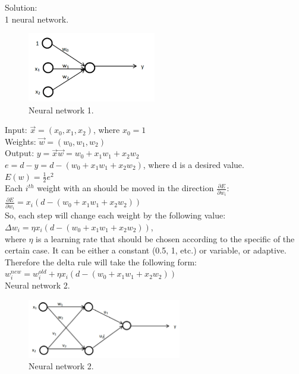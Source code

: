 \documentclass[a4paper, 12pt]{article}
\begin{document}
Solution:\\

1 neural network.\\

\begin{figure}[h]
  \centering
  \caption{Neural network 1. \label{fig:nn1}}
  \includegraphics[width=0.5\textwidth]{nn1}
\end{figure}

Input: 	$\vec{x} = (x_0, x_1, x_2)$,  where $x_0 = 1$\\
Weights: 	$\vec{w} = (w_0, w_1, w_2)$\\
Output: $y = \vec{x} \vec{w} = w_0 + x_1w_1 + x_2w_2$\\

$e = d - y = d - (w_0 + x_1w_1 + x_2w_2)$, where d is a desired value.\\

$E(w) = \frac{1}{2}e^2$\\

Each $i^{th}$ weight with an should be moved in the direction $\frac{\partial E}{\partial w_i}$:\\

$\frac{\partial E}{\partial w_i} = x_i(d - (w_0 + x_1w_1 + x_2w_2))$\\

So, each step will change each weight by the following value:\\
$\Delta w_i = \eta x_i(d - (w_0 + x_1w_1 + x_2w_2))$,\\
where $\eta$ is a learning rate that should be chosen according to the specific of the certain case. It can be either a constant (0.5, 1, etc.) or variable, or adaptive.\\

Therefore the delta rule will take the following form:\\

$w_i^{new} = w_i^{old} + \eta x_i(d - (w_0 + x_1w_1 + x_2w_2))$\\

Neural network 2.

\begin{figure}[h]
  \centering
  \caption{Neural network 2. \label{fig:nn2}}
  \includegraphics[width=0.6\textwidth]{nn2}
\end{figure}
\end{document}
